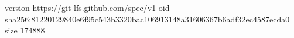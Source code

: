 version https://git-lfs.github.com/spec/v1
oid sha256:81220129840e6f95c543b3320bac106913148a31606367b6adf32ec4587ecda0
size 174888
